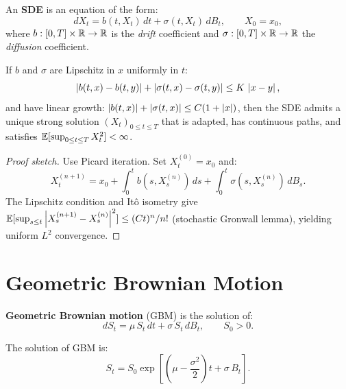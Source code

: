 \begin{definition}
An \textbf{SDE} is an equation of the form:
\[
  dX_t = b(t, X_t)\,dt + \sigma(t, X_t)\,dB_t, \qquad X_0 = x_0,
\]
where $b:[0,T]\times\mathbb{R}\to\mathbb{R}$ is the \emph{drift} coefficient and
$\sigma:[0,T]\times\mathbb{R}\to\mathbb{R}$ the \emph{diffusion} coefficient.
\end{definition}

\begin{theorem}
\label{thm:existence_sde}
If $b$ and $\sigma$ are Lipschitz in $x$ uniformly in $t$:
\[
  \left| b(t,x) - b(t,y) \right| + \left| \sigma(t,x) - \sigma(t,y) \right| \leq K\,\left| x-y \right|,
\]
and have linear growth: $\left| b(t,x) \right| + \left| \sigma(t,x) \right| \leq C(1+\left| x \right|)$,
then the SDE admits a unique strong solution $(X_t)_{0 \leq t \leq T}$
that is adapted, has continuous paths, and satisfies
$\mathbb{E}[\sup_{0 \leq t \leq T} X_t^2] < \infty$.
\end{theorem}

\begin{proof}[Proof sketch]
Use Picard iteration. Set $X_t^{(0)} = x_0$ and:
\[
  X_t^{(n+1)} = x_0 + \int_0^t b(s, X_s^{(n)})\,ds
    + \int_0^t \sigma(s, X_s^{(n)})\,dB_s.
\]
The Lipschitz condition and It\^o isometry give
$\mathbb{E}[\sup_{s \leq t} \left| X_s^{(n+1)} - X_s^{(n)} \right|^2]
\leq (Ct)^n/n!$ (stochastic Gronwall lemma), yielding uniform $L^2$
convergence.
\end{proof}

\section{Geometric Brownian Motion}
\label{sec:gbm}

\begin{definition}
\textbf{Geometric Brownian motion} (GBM) is the solution of:
\[
  dS_t = \mu\,S_t\,dt + \sigma\,S_t\,dB_t, \qquad S_0 > 0.
\]
\end{definition}

\begin{theorem}
\label{thm:gbm_solution}
The solution of GBM is:
\[
  S_t = S_0\exp\left[\left(\mu - \frac{\sigma^2}{2}\right)t
    + \sigma\,B_t\right].
\]
\end{theorem}

